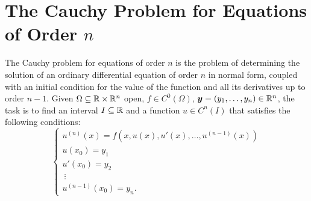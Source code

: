 \section{The Cauchy Problem for Equations of Order $n$}

The Cauchy problem for equations of order $n$ is the problem of determining the
solution of an ordinary differential equation of order $n$ in normal form,
coupled with an initial condition for the value of the function and all its
derivatives up to order $n-1$. Given $\Omega\subseteq {\mathbb R}\times {\mathbb R}^n$ open, $f\in
C^0(\Omega)$, $\boldsymbol y = (y_1, \dots, y_n) \in {\mathbb R}^n$, the task is to find an
interval $I\subseteq {\mathbb R}$ and a function $u\in C^n(I)$ that satisfies the
following conditions:
\begin{equation}\label{eq:problema_cauchy_ordine_n}
  \begin{cases}
    u^{(n)}(x) = f(x,u(x), u'(x), \dots, u^{(n-1)}(x))\\
    u(x_0) = y_1 \\
    u'(x_0) = y_2 \\
    \ \vdots \\
    u^{(n-1)}(x_0) = y_n.
  \end{cases}
\end{equation}

